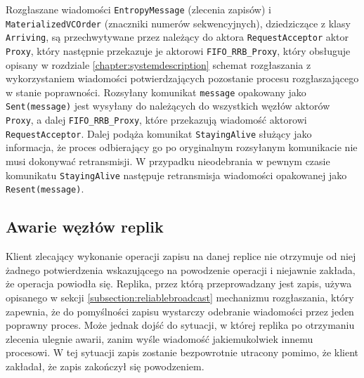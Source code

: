 Rozgłaszane wiadomości \texttt{EntropyMessage} (zlecenia zapisów) i \texttt{MaterializedVCOrder} (znaczniki numerów sekwencyjnych), dziedziczące z klasy \texttt{Arriving}, są przechwytywane przez należący do aktora \texttt{RequestAcceptor} aktor \texttt{Proxy}, który następnie przekazuje je aktorowi \texttt{FIFO\_RRB\_Proxy}, który obsługuje opisany w rozdziale \ref{chapter:systemdescription} schemat rozgłaszania z wykorzystaniem wiadomości potwierdzających pozostanie procesu rozgłaszającego w stanie poprawności. Rozsyłany komunikat \texttt{message} opakowany jako \texttt{Sent(message)} jest wysyłany do należących do wszystkich węzłów aktorów \texttt{Proxy}, a dalej \texttt{FIFO\_RRB\_Proxy}, które przekazują wiadomość aktorowi \texttt{RequestAcceptor}. Dalej podąża komunikat \texttt{StayingAlive} służący jako informacja, że proces odbierający go po oryginalnym rozsyłanym komunikacie nie musi dokonywać retransmisji. W przypadku nieodebrania w pewnym czasie komunikatu \texttt{StayingAlive} następuje retransmisja wiadomości opakowanej jako \texttt{Resent(message)}.


\subsection{Awarie węzłów replik} \label{subsection:replicafailures}

Klient zlecający wykonanie operacji zapisu na danej replice nie otrzymuje od niej żadnego potwierdzenia wskazującego na powodzenie operacji i niejawnie zakłada, że operacja powiodła się. Replika, przez którą przeprowadzany jest zapis, używa opisanego w sekcji \ref{subsection:reliablebroadcast} mechanizmu rozgłaszania, który zapewnia, że do pomyślności zapisu wystarczy odebranie wiadomości przez jeden poprawny proces. Może jednak dojść do sytuacji, w której replika po otrzymaniu zlecenia ulegnie awarii, zanim wyśle wiadomość jakiemukolwiek innemu procesowi. W tej sytuacji zapis zostanie bezpowrotnie utracony pomimo, że klient zakładał, że zapis zakończył się powodzeniem.

